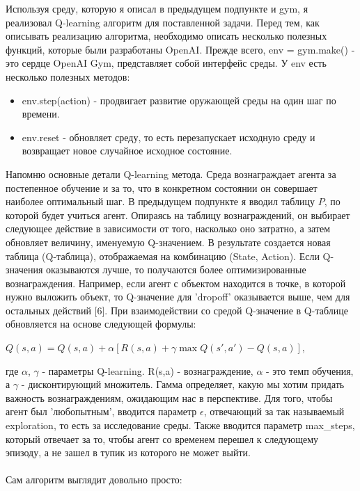 \documentclass[a4paper]{report}
\theoremstyle{definition}
\theoremstyle{plain}
\theoremstyle{remark}
\theoremstyle{remark}
\theoremstyle{definition}
\begin{document}
Используя среду, которую я описал в предыдущем подпункте и gym, я реализовал Q-learning алгоритм для поставленной задачи. Перед тем, как описывать реализацию алгоритма, необходимо описать несколько полезных функций, которые были разработаны OpenAI. Прежде всего, env = gym.make() - это сердце OpenAI Gym, представляет собой интерфейс среды. У env есть несколько полезных методов:
\begin{itemize}
    \item env.step(action) - продвигает развитие оружающей среды на один шаг по времени.
    \item env.reset - обновляет среду, то есть перезапускает исходную среду и возвращает новое случайное исходное состояние.
\end{itemize}
Напомню основные детали Q-learning метода. Среда вознаграждает агента за постепенное обучение и за то, что в конкретном состоянии он совершает наиболее оптимальный шаг. В предыдущем подпункте я вводил таблицу $P$, по которой будет учиться агент. Опираясь на таблицу вознаграждений, он выбирает следующее действие в зависимости от того, насколько оно затратно, а затем обновляет величину, именуемую Q-значением. В результате создается новая таблица (Q-таблица), отображаемая на комбинацию (State, Action). Если Q-значения оказываются лучше, то получаются более оптимизированные вознаграждения. Например, если агент с объектом находится в точке, в которой нужно выложить объект, то Q-значение для 'dropoff' оказывается выше, чем для остальных действий [6]. При взаимодействии со средой Q-значение в Q-таблице обновляется на основе следующей формулы:
\begin{center}
    $
    Q(s,a) = Q(s,a) + \alpha[R(s,a) + \gamma \max Q(s',a') - Q(s,a)],
    $
\end{center}
где $\alpha$, $\gamma$ - параметры Q-learning. R(s,a) - вознаграждение, $\alpha$ - это темп обучения, а $\gamma$ - дисконтирующий множитель. Гамма определяет, какую мы хотим придать важность вознаграждениям, ожидающим нас в перспективе. Для того, чтобы агент был 'любопытным', вводится параметр $\epsilon$, отвечающий за так называемый exploration, то есть за исследование среды. Также вводится параметр max\_steps, который отвечает за то, чтобы агент со временем перешел к следующему эпизоду, а не зашел в тупик из которого не может выйти.\\
\\
Сам алгоритм выглядит довольно просто:
\end{document}
